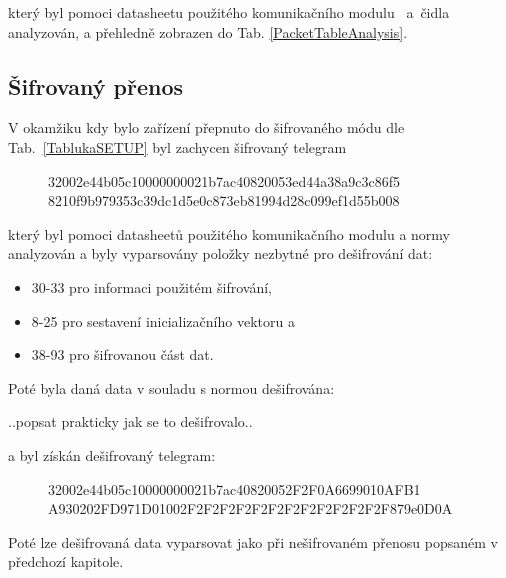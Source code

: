 který byl pomoci datasheetu použitého komunikačního modulu~\cite{ModulIQRF} a~čidla~\cite{CidloWeptech} analyzován, a přehledně zobrazen do Tab. \ref{PacketTableAnalysis}.

\subsection{Šifrovaný přenos}

V okamžiku kdy bylo zařízení přepnuto do šifrovaného módu dle Tab.~\ref{TablukaSETUP} byl zachycen šifrovaný telegram

\begin{figure}[!ht]
\begin{centerverbatim}
	32002e44b05c10000000021b7ac40820053ed44a38a9c3c86f5
	8210f9b979353c39dc1d5e0c873eb81994d28c099ef1d55b008
\end{centerverbatim}
\end{figure}

který byl pomoci datasheetů použitého komunikačního modulu \cite{ModulIQRF} a normy~\cite{Norma1,NormaFIPS} analyzován a byly vyparsovány položky nezbytné pro dešifrování dat:
\begin{itemize}
	\item 30-33 pro informaci použitém šifrování,
	\item 8-25 pro sestavení inicializačního vektoru a
	\item 38-93 pro šifrovanou část dat.
\end{itemize}

Poté byla daná data v souladu s normou \cite{NormaFIPS} dešifrována:


..\colorbox[rgb]{1,0,0}{popsat prakticky jak se to dešifrovalo}..


 a byl získán dešifrovaný telegram:

\begin{figure}[!ht]
\begin{centerverbatim}
	32002e44b05c10000000021b7ac40820052F2F0A6699010AFB1
	A930202FD971D01002F2F2F2F2F2F2F2F2F2F2F2F2F879e0D0A
\end{centerverbatim}
\end{figure}

Poté lze dešifrovaná data vyparsovat jako při nešifrovaném přenosu popsaném v předchozí kapitole.

